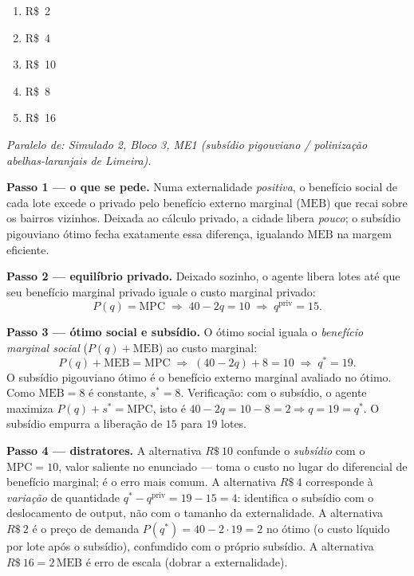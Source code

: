 \begin{enumerate}[label=\Alph*., leftmargin=3.2em, itemsep=0.15em, topsep=0.2em]
  \item R\$~2
  \item R\$~4
  \item R\$~10
  \item R\$~8
  \item R\$~16
\end{enumerate}
\begin{solucao}
{\footnotesize\textit{Paralelo de: Simulado 2, Bloco 3, ME1 (subsídio pigouviano / polinização abelhas-laranjais de Limeira).}}\par\vspace{0.2em}
\textbf{Passo 1 --- o que se pede.} Numa externalidade \emph{positiva}, o benef\'icio social de cada lote excede o privado pelo benef\'icio externo marginal ($\text{MEB}$) que recai sobre os bairros vizinhos. Deixada ao c\'alculo privado, a cidade libera \emph{pouco}; o subs\'idio pigouviano \'otimo fecha exatamente essa diferen\c{c}a, igualando $\text{MEB}$ na margem eficiente.

\textbf{Passo 2 --- equil\'ibrio privado.} Deixado sozinho, o agente libera lotes at\'e que seu benef\'icio marginal privado iguale o custo marginal privado:
\[
P(q)=\text{MPC}\;\Longrightarrow\;40-2q=10\;\Longrightarrow\; q^{\text{priv}}=15.
\]

\textbf{Passo 3 --- \'otimo social e subs\'idio.} O \'otimo social iguala o \emph{benef\'icio marginal social} ($P(q)+\text{MEB}$) ao custo marginal:
\[
P(q)+\text{MEB}=\text{MPC}\;\Longrightarrow\;(40-2q)+8=10\;\Longrightarrow\; q^{*}=19.
\]
O subs\'idio pigouviano \'otimo \'e o benef\'icio externo marginal avaliado no \'otimo. Como $\text{MEB}=8$ \'e constante, $s^{*}=8$. Verifica\c{c}\~ao: com o subs\'idio, o agente maximiza $P(q)+s^{*}=\text{MPC}$, isto \'e $40-2q=10-8=2\Rightarrow q=19=q^{*}$. O subs\'idio empurra a libera\c{c}\~ao de $15$ para $19$ lotes.

\textbf{Passo 4 --- distratores.} A alternativa $R\$~10$ confunde o \emph{subs\'idio} com o $\text{MPC}=10$, valor saliente no enunciado --- toma o custo no lugar do diferencial de benef\'icio marginal; \'e o erro mais comum. A alternativa $R\$~4$ corresponde \`a \emph{varia\c{c}\~ao} de quantidade $q^{*}-q^{\text{priv}}=19-15=4$: identifica o subs\'idio com o deslocamento de output, n\~ao com o tamanho da externalidade. A alternativa $R\$~2$ \'e o pre\c{c}o de demanda $P(q^{*})=40-2\cdot 19=2$ no \'otimo (o custo l\'iquido por lote ap\'os o subs\'idio), confundido com o pr\'oprio subs\'idio. A alternativa $R\$~16=2\,\text{MEB}$ \'e erro de escala (dobrar a externalidade).


\end{solucao}
